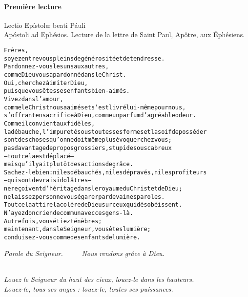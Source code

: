 \documentclass[twoside]{article}
\begin{document}
\paragraph{Première lecture}

\begin{paracol}{2}
Lectio Epístolæ beati Páuli \\ Apóstoli ad Ephésios.
\switchcolumn
Lecture de la lettre de Saint Paul, Apôtre, aux Éphésiens.
\end{paracol}
\begin{alltt}\normalfont
    Frères,
        soyez entre vous pleins de générosité et de tendresse.
    Pardonnez-vous les uns aux autres,
        comme Dieu vous a pardonné dans le Christ.
    Oui, cherchez à imiter Dieu,
        puisque vous êtes ses enfants bien-aimés.
    Vivez dans l’amour,
        comme le Christ nous a aimés et s’est livré lui-même pour nous,
        s’offrant en sacrifice à Dieu, comme un parfum d’agréable odeur.
    Comme il convient aux fidèles,
        la débauche, l’impureté sous toutes ses formes et la soif de posséder
        sont des choses qu’on ne doit même plus évoquer chez vous ;
    pas davantage de propos grossiers, stupides ou scabreux
        – tout cela est déplacé –
        mais qu’il y ait plutôt des actions de grâce.
    Sachez-le bien : ni les débauchés, ni les dépravés, ni les profiteurs
        – qui sont de vrais idolâtres –
        ne reçoivent d’héritage dans le royaume du Christ et de Dieu ;
        ne laissez personne vous égarer par de vaines paroles.
    Tout cela attire la colère de Dieu sur ceux qui désobéissent.
        N’ayez donc rien de commun avec ces gens-là.
    Autrefois, vous étiez ténèbres ;
        maintenant, dans le Seigneur, vous êtes lumière ;
        conduisez-vous comme des enfants de lumière.
\end{alltt}


\emph{\vv Parole du Seigneur. ~~~~ \rr Nous rendons grâce à Dieu.}


\\
\emph{\rr Louez le Seigneur du haut des cieux, louez-le dans les hauteurs.\\
\vv Louez-le, tous ses anges : louez-le, toutes ses puissances.}\\

\pagebreak

\end{document}
